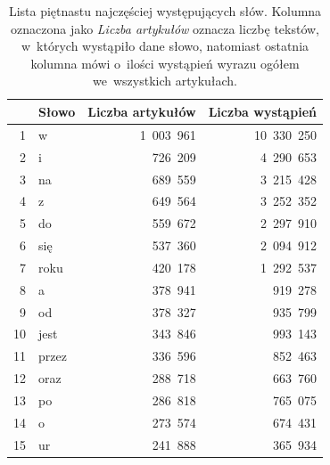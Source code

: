 \documentclass{praca1}
\begin{document}
\begin{table}[!h]
\centering
\caption{Lista piętnastu najczęściej występujących słów. Kolumna oznaczona jako \emph{Liczba artykułów} oznacza liczbę tekstów, w~których wystąpiło dane słowo, natomiast ostatnia kolumna mówi o~ilości wystąpień wyrazu ogółem we~wszystkich artykułach.} \smallskip
\begin{tabular}{|r|l|r|r|}
  \hline
 & Słowo & Liczba artykułów & Liczba wystąpień \\ 
  \hline
1 & w~& 1\ 003\ 961 & 10\ 330\ 250 \\ 
  2 & i~& 726\ 209 & 4\ 290\ 653 \\ 
  3 & na~& 689\ 559 & 3\ 215\ 428 \\ 
  4 & z~& 649\ 564 & 3\ 252\ 352 \\ 
  5 & do~& 559\ 672 & 2\ 297\ 910 \\ 
  6 & się & 537\ 360 & 2\ 094\ 912 \\ 
  7 & roku & 420\ 178 & 1\ 292\ 537 \\ 
  8 & a~& 378\ 941 & 919\ 278 \\ 
  9 & od~& 378\ 327 & 935\ 799 \\ 
  10 & jest & 343\ 846 & 993\ 143 \\ 
  11 & przez & 336\ 596 & 852\ 463 \\ 
  12 & oraz & 288\ 718 & 663\ 760 \\ 
  13 & po~& 286\ 818 & 765\ 075 \\ 
  14 & o~& 273\ 574 & 674\ 431 \\ 
  15 & ur~& 241\ 888 & 365\ 934 \\ 
   \hline
\end{tabular}
\label{tab:001}
\end{table}
\end{document}
